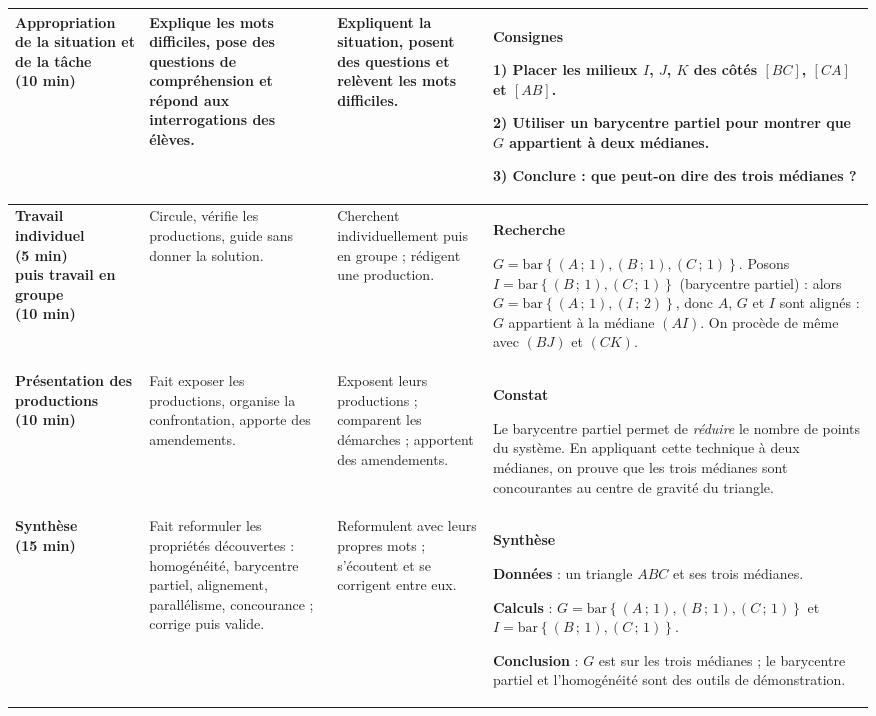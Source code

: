 \documentclass[10pt,a4paper]{article}
\providecommand{\hl}[1]{\colorbox{cHl}{#1}}                  %
\newcommand{\barG}[1]{\mathrm{bar}\left\{#1\right\}}          %
\begin{document}
{\begin{longtable}{|L{3.0cm}|L{4.5cm}|L{3.5cm}|L{5.5cm}|}
\textbf{\color{cEx}Appropriation de la situation et de la tâche\newline(10 min)}
& Explique les mots difficiles, pose des questions de compréhension et répond aux interrogations des élèves.
& Expliquent la situation, posent des questions et relèvent les mots difficiles.
& \textbf{\color{cEx}Consignes}\par
1) Placer les milieux $I$, $J$, $K$ des côtés $[BC]$, $[CA]$ et $[AB]$.\par
2) Utiliser un barycentre partiel pour montrer que $G$ appartient à deux médianes.\par
3) Conclure : que peut-on dire des trois médianes ?
\\\hline

\textbf{\color{cMeth}Travail individuel\newline(5 min)\newline puis travail en groupe\newline(10 min)}
& Circule, vérifie les productions, guide sans donner la solution.
& Cherchent individuellement puis en groupe ; rédigent une production.
& \textbf{\color{cMeth}Recherche}\par
$G=\barG{(A\,;\,1),(B\,;\,1),(C\,;\,1)}$. Posons $I=\barG{(B\,;\,1),(C\,;\,1)}$ (barycentre partiel) : alors $G=\barG{(A\,;\,1),(I\,;\,2)}$, donc $A$, $G$ et $I$ sont alignés : $G$ appartient à la médiane $(AI)$. On procède de même avec $(BJ)$ et $(CK)$.
\\\hline

\textbf{\color{cProp}Présentation des productions\newline(10 min)}
& Fait exposer les productions, organise la confrontation, apporte des amendements.
& Exposent leurs productions ; comparent les démarches ; apportent des amendements.
& \textbf{\color{cProp}Constat}\par
Le barycentre partiel permet de \emph{réduire} le nombre de points du système. En appliquant cette technique à deux médianes, on prouve que les trois médianes sont concourantes au \hl{centre de gravité} du triangle.
\\\hline

\textbf{\color{cProp}Synthèse\newline(15 min)}
& Fait reformuler les propriétés découvertes : homogénéité, barycentre partiel, alignement, parallélisme, concourance ; corrige puis valide.
& Reformulent avec leurs propres mots ; s'écoutent et se corrigent entre eux.
& \textbf{\color{cProp}Synthèse}\par
\textbf{Données} : un triangle $ABC$ et ses trois médianes.\par
\textbf{Calculs} : $G=\barG{(A\,;\,1),(B\,;\,1),(C\,;\,1)}$ et $I=\barG{(B\,;\,1),(C\,;\,1)}$.\par
\textbf{Conclusion} : $G$ est sur les trois médianes ; le barycentre partiel et l'homogénéité sont des \hl{outils de démonstration}.
\\\hline


\end{longtable}}
\end{document}
